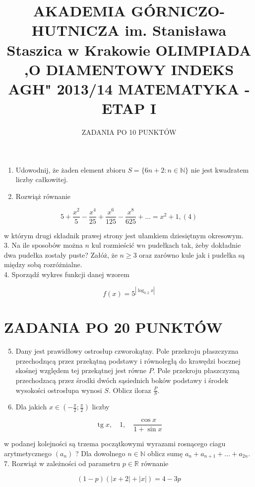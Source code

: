\documentclass[10pt]{article}
\title{AKADEMIA GÓRNICZO-HUTNICZA im. Stanisława Staszica w Krakowie OLIMPIADA ,O DIAMENTOWY INDEKS AGH" 2013/14 MATEMATYKA - ETAP I }
\author{ZADANIA PO 10 PUNKTÓW}
\date{}
\begin{document}
\maketitle


\begin{enumerate}
  \item Udowodnij, że żaden element zbioru $S=\{6 n+2: n \in \mathbb{N}\}$ nie jest kwadratem liczby całkowitej.
  \item Rozwiąż równanie
\end{enumerate}

$$
5+\frac{x^{2}}{5}-\frac{x^{4}}{25}+\frac{x^{6}}{125}-\frac{x^{8}}{625}+\ldots=x^{2}+1,(4)
$$

w którym drugi składnik prawej strony jest ułamkiem dziesiętnym okresowym.\\
3. Na ile sposobów można $n$ kul rozmieścić $\mathrm{w} n$ pudełkach tak, żeby dokładnie dwa pudełka zostały puste? Załóż, że $n \geq 3$ oraz zarówno kule jak i pudełka są między sobą rozróżnialne.\\
4. Sporządź wykres funkcji danej wzorem

$$
f(x)=5^{\left|\log _{0,2} x\right|}
$$

\section*{ZADANIA PO 20 PUNKTÓW}
\begin{enumerate}
  \setcounter{enumi}{4}
  \item Dany jest prawidłowy ostrosłup czworokątny. Pole przekroju płaszczyzna przechodzącą przez przekątną podstawy i równoległą do krawędzi bocznej skośnej względem tej przekątnej jest równe $P$. Pole przekroju płaszczyzną przechodzacą przez środki dwóch sąsiednich boków podstawy i środek wysokości ostrosłupa wynosi $S$. Oblicz iloraz $\frac{P}{S}$.
  \item Dla jakich $x \in\left(-\frac{\pi}{2} ; \frac{\pi}{2}\right)$ liczby
\end{enumerate}

$$
\operatorname{tg} x, \quad 1, \quad \frac{\cos x}{1+\sin x}
$$

w podanej kolejności są trzema początkowymi wyrazami rosnącego ciagu arytmetycznego $\left(a_{n}\right)$ ? Dla dowolnego $n \in \mathbb{N}$ oblicz sumę $a_{n}+a_{n+1}+\ldots+a_{2 n}$.\\
7. Rozwiąż w zależności od parametru $p \in \mathbb{R}$ równanie

$$
(1-p)(|x+2|+|x|)=4-3 p
$$
\end{document}
